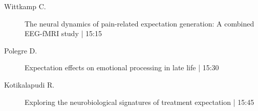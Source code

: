 \begin{symposium}
\begin{description}
                \item [ Wittkamp C.] The neural dynamics of pain-related expectation generation: A combined EEG-fMRI study \textcolor{mygray}{ | 15:15}    
                
                \item [ Polegre D.] Expectation effects on emotional processing in late life \textcolor{mygray}{ | 15:30}    
                
                \item [ Kotikalapudi R.] Exploring the neurobiological signatures of treatment expectation \textcolor{mygray}{ | 15:45}    
                
            \end{description} 
            \end{symposium}
            